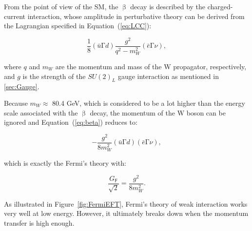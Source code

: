 From the point of view of the \ac{SM}, the $\upbeta$ decay is described by the charged-current interaction, whose amplitude in perturbative theory can be derived from the Lagrangian specified in Equation~(\ref{eq:LCC}):

\begin{equation}
\label{eq:beta}
\frac{1}{8}(\bar{u}\mathrm{\Gamma}d)\frac{g^2}{q^2-m_{W}^2}(\bar{e}\mathrm{\Gamma}\nu),
\end{equation}

where $q$ and $m_W$ are the momentum and mass of the W propagator, respectively, and $g$ is the strength of the $SU(2)_{L}$ gauge interaction as mentioned in \autoref{sec:Gauge}.

Because $m_W\approx$ 80.4 GeV, which is considered to be a lot higher than the energy scale associated with the $\upbeta$ decay, the momentum of the W boson can be ignored and Equation~(\ref{eq:beta}) reduces to:

\begin{equation}
\label{eq:beta2}
-\frac{g^2}{8m_{W}^2}(\bar{u}\mathrm{\Gamma}d)(\bar{e}\mathrm{\Gamma}\nu),
\end{equation}

which is exactly the Fermi's theory with:

\begin{equation}
\frac{G_{\textsf{F}}}{\sqrt{2}}=\frac{g^2}{8m_{W}^2}.
\end{equation}

As illustrated in Figure~\ref{fig:FermiEFT}, Fermi's theory of weak interaction works very well at low energy. However, it ultimately breaks down when the momentum transfer is high enough. 


